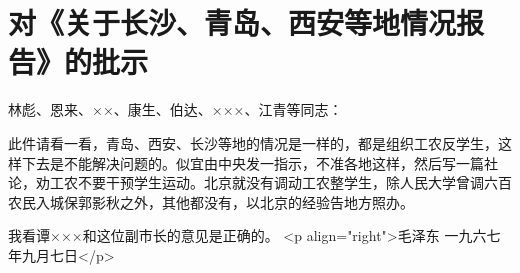 \section[对《关于长沙、青岛、西安等地情况报告》的批示（一九六六年九月七日）]{对《关于长沙、青岛、西安等地情况报告》的批示}


林彪、恩来、××、康生、伯达、×××、江青等同志：

此件请看一看，青岛、西安、长沙等地的情况是一样的，都是组织工农反学生，这样下去是不能解决问题的。似宜由中央发一指示，不准各地这样，然后写一篇社论，劝工农不要干预学生运动。北京就没有调动工农整学生，除人民大学曾调六百农民入城保郭影秋之外，其他都没有，以北京的经验告地方照办。

我看谭×××和这位副市长的意见是正确的。
<p align="right">毛泽东
一九六七年九月七日</p>


